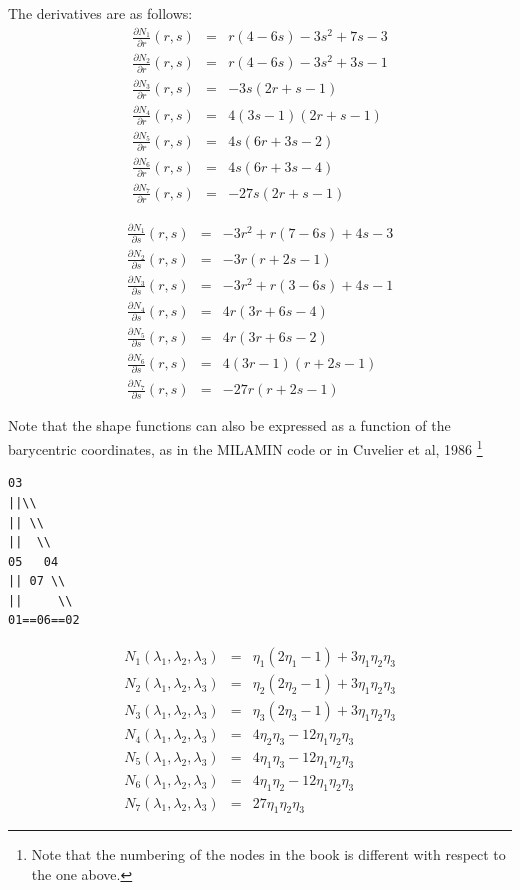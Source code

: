The derivatives are as follows:
\begin{eqnarray}
\frac{\partial N_1}{\partial r}(r,s) &=& r(4-6s)-3s^2+7s-3\\
\frac{\partial N_2}{\partial r}(r,s) &=& r(4-6s)-3s^2+3s-1\\
\frac{\partial N_3}{\partial r}(r,s) &=& -3s(2r+s-1)  \\
\frac{\partial N_4}{\partial r}(r,s) &=& 4(3s-1)(2r+s-1) \\
\frac{\partial N_5}{\partial r}(r,s) &=& 4s(6r+3s-2) \\
\frac{\partial N_6}{\partial r}(r,s) &=& 4s(6r+3s-4)\\
\frac{\partial N_7}{\partial r}(r,s) &=& -27s(2r+s-1)
\end{eqnarray}

\begin{eqnarray}
\frac{\partial N_1}{\partial s}(r,s) &=& -3r^2+r(7-6s)+4s-3\\
\frac{\partial N_2}{\partial s}(r,s) &=& -3r(r+2s-1)\\
\frac{\partial N_3}{\partial s}(r,s) &=& -3r^2+r(3-6s)+4s-1 \\
\frac{\partial N_4}{\partial s}(r,s) &=& 4r(3r+6s-4)  \\
\frac{\partial N_5}{\partial s}(r,s) &=& 4r(3r+6s-2) \\
\frac{\partial N_6}{\partial s}(r,s) &=& 4(3r-1)(r+2s-1)\\
\frac{\partial N_7}{\partial s}(r,s) &=& -27r(r+2s-1)
\end{eqnarray}


Note that the shape functions can also be expressed as a function of the barycentric coordinates, 
as in the MILAMIN code \cite{daks08} or in Cuvelier et al, 1986 \cite{cuss86}\footnote{Note
that the numbering of the nodes in the book is different with respect to the one above. }

\begin{verbatim}
03          
||\\        
|| \\       
||  \\      
05   04     
|| 07 \\    
||     \\   
01==06==02    
\end{verbatim}

\begin{eqnarray}
N_1(\lambda_1,\lambda_2,\lambda_3) &=& \eta_1(2\eta_1-1)+ 3\eta_1\eta_2\eta_3\\
N_2(\lambda_1,\lambda_2,\lambda_3) &=& \eta_2(2\eta_2-1)+ 3\eta_1\eta_2\eta_3\\
N_3(\lambda_1,\lambda_2,\lambda_3) &=& \eta_3(2\eta_3-1)+ 3\eta_1\eta_2\eta_3\\
N_4(\lambda_1,\lambda_2,\lambda_3) &=& 4\eta_2\eta_3 - 12\eta_1\eta_2\eta_3\\
N_5(\lambda_1,\lambda_2,\lambda_3) &=& 4\eta_1\eta_3 - 12\eta_1\eta_2\eta_3\\
N_6(\lambda_1,\lambda_2,\lambda_3) &=& 4\eta_1\eta_2 - 12\eta_1\eta_2\eta_3\\
N_7(\lambda_1,\lambda_2,\lambda_3) &=& 27\eta_1\eta_2\eta_3 
\end{eqnarray}

